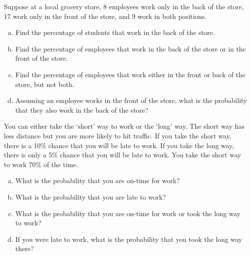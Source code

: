 \documentclass[11pt,letterpaper]{article}
\begin{document}

 Suppose at a local grocery store, 8 employees work only in the back of the store, 17 work only in the front of the store, and 9 work in both positions.
	\begin{enumerate}[(a)]
	\item Find the percentage of students that work in the back of the store.
	\item Find the percentage of employees that work in the back of the store or in the front of the store.
	\item Find the percentage of employees that work either in the front or back of the store, but not both. 
	\item Assuming an employee works in the front of the store, what is the probability that they also work in the back of the store?
	\end{enumerate}



\newpage



 You can either take the `short' way to work or the `long' way. The short way has less distance but you are more likely to hit traffic. If you take the short way, there is a 10\% chance that you will be late to work. If you take the long way, there is only a 5\% chance that you will be late to work. You take the short way to work 70\% of the time.
	\begin{enumerate}[(a)]
	\item What is the probability that you are on-time for work?
	\item What is the probability that you are late to work?
	\item What is the probability that you are on-time for work or took the long way to work?
	\item If you were late to work, what is the probability that you took the long way there?
	\end{enumerate}
\end{document}
